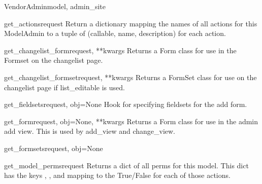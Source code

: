 \documentclass[letterpaper,10pt,english]{sphinxmanual}
\begin{document}
\begin{classdesc}{VendorAdmin}{model, admin\_site}
\hypertarget{data.admin.VendorAdmin.get_actions}{}\begin{methoddesc}{get\_actions}{request}
Return a dictionary mapping the names of all actions for this
ModelAdmin to a tuple of (callable, name, description) for each action.
\end{methoddesc}

\hypertarget{data.admin.VendorAdmin.get_changelist_form}{}\begin{methoddesc}{get\_changelist\_form}{request, **kwargs}
Returns a Form class for use in the Formset on the changelist page.
\end{methoddesc}

\hypertarget{data.admin.VendorAdmin.get_changelist_formset}{}\begin{methoddesc}{get\_changelist\_formset}{request, **kwargs}
Returns a FormSet class for use on the changelist page if list\_editable
is used.
\end{methoddesc}

\hypertarget{data.admin.VendorAdmin.get_fieldsets}{}\begin{methoddesc}{get\_fieldsets}{request, obj=None}
Hook for specifying fieldsets for the add form.
\end{methoddesc}

\hypertarget{data.admin.VendorAdmin.get_form}{}\begin{methoddesc}{get\_form}{request, obj=None, **kwargs}
Returns a Form class for use in the admin add view. This is used by
add\_view and change\_view.
\end{methoddesc}

\hypertarget{data.admin.VendorAdmin.get_formsets}{}\begin{methoddesc}{get\_formsets}{request, obj=None}\end{methoddesc}

\hypertarget{data.admin.VendorAdmin.get_model_perms}{}\begin{methoddesc}{get\_model\_perms}{request}
Returns a dict of all perms for this model. This dict has the keys
, , and  mapping to the True/False for each
of those actions.
\end{methoddesc}


\end{classdesc}
\end{document}
